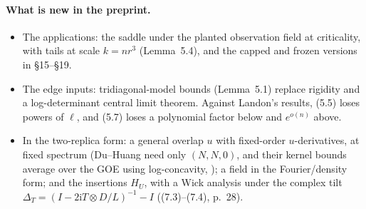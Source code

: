 \documentclass[11pt]{article}
\newcommand{\ploc}[2]{#1}
\newcommand{\sloc}[2]{\cite[#2]{#1}}
\begin{document}
\paragraph{What is new in the preprint.}
\begin{itemize}
\item The applications: the saddle under the planted observation field at
criticality, with tails at scale $k=nr^3$ (Lemma~5.4), and the capped and
frozen versions in \S15--\S19.
\item The edge inputs: tridiagonal-model bounds (Lemma~5.1) replace
rigidity and a log-determinant central limit theorem. Against Landon's
results, (5.5) loses powers of $\ell$, and (5.7) loses a polynomial factor
below and $e^{o(n)}$ above.
\item In the two-replica form: a general overlap $u$ with fixed-order
$u$-derivatives, at fixed spectrum (Du--Huang need only $(N,N,0)$, and
their kernel bounds average over the GOE using log-concavity,
\sloc{DuHuang2026-CriticalSKFreeEnergyFluctuations}{Lemma~3.3, Cor.~3.4});
a field in the Fourier/density form; and the insertions $H_U$, with a Wick
analysis under the complex tilt
$\Delta_T=(I-2\mathrm iT\otimes D/L)^{-1}-I$
\ploc{((7.3)--(7.4), p.~28)}{profile-spectral.tex:1244--1276}.
\end{itemize}
\end{document}
